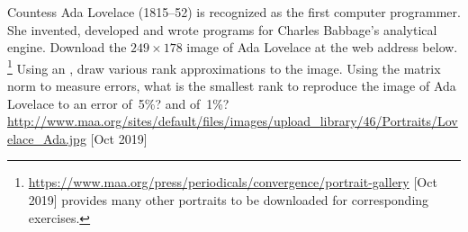 \begin{exercise} \label{ex:lovelace} 
Countess Ada Lovelace (1815--52) is recognized as the first computer programmer. She invented, developed and wrote programs for Charles Babbage's analytical engine.
Download the \(249\times178\) image of Ada Lovelace at the web address below.
\footnote{\protect\url{https://www.maa.org/press/periodicals/convergence/portrait-gallery} [Oct 2019] provides many other portraits to be downloaded for corresponding exercises.}
Using an \svd, draw various rank approximations to the image.
Using the matrix norm to measure errors, what is the smallest rank to reproduce the image of Ada Lovelace to an error of~5\%? and of~1\%?
\\
\url{http://www.maa.org/sites/default/files/images/upload_library/46/Portraits/Lovelace_Ada.jpg} 
[Oct 2019]
\end{exercise}








